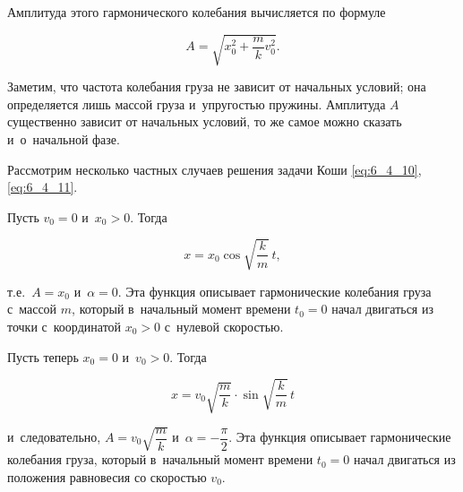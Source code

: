 Амплитуда этого гармонического колебания вычисляется по формуле

\begin{equation*}
A = \sqrt{x^{2}_{0} + \dfrac{m}{k} v^{2}_{0}}.
\end{equation*}

Заметим, что частота колебания груза не зависит от начальных условий; она определяется
лишь массой груза и~упругостью пружины. Амплитуда $A$ существенно зависит от начальных
условий, то же самое можно сказать и~о~начальной фазе.

Рассмотрим несколько частных случаев решения задачи Коши
\eqref{eq:6_4_10}, \eqref{eq:6_4_11}.

Пусть $v_{0} = 0$ и~$x_{0} > 0$. Тогда

\begin{equation*}
x = x_{0} \cos \sqrt{\dfrac{k}{m}} \, t,
\end{equation*}

\noindent
т.е.\ $A = x_{0}$ и~$\alpha = 0$. Эта функция описывает гармонические колебания груза
с~массой $m$, который в~начальный момент времени $t_{0} = 0$ начал двигаться из точки
с~координатой $x_{0} > 0$ с~нулевой скоростью.

Пусть теперь $x_{0} = 0$ и~$v_{0} > 0$. Тогда

\begin{equation*}
x = v_{0} \sqrt{\dfrac{m}{k}} \cdot \sin \sqrt{\dfrac{k}{m}} \, t
\end{equation*}

\noindent
и~следовательно, $A = v_{0} \sqrt{\dfrac{m}{k}}$ и~$\alpha = -\dfrac{\pi}{2}$.
Эта функция описывает гармонические колебания груза, который в~начальный момент времени
$t_{0} = 0$ начал двигаться из положения равновесия со скоростью $v_{0}$.
